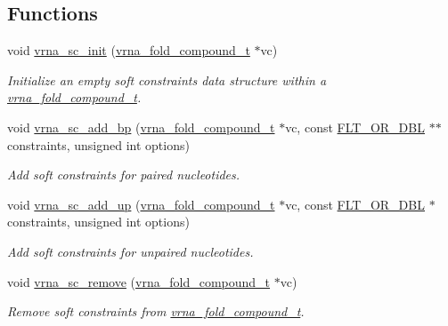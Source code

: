 \subsection*{Functions}
\begin{DoxyCompactItemize}
\item 
void \hyperlink{group__soft__constraints_ga9d977a1681356778cc66dceafbe5b032}{vrna\+\_\+sc\+\_\+init} (\hyperlink{group__fold__compound_ga1b0cef17fd40466cef5968eaeeff6166}{vrna\+\_\+fold\+\_\+compound\+\_\+t} $\ast$vc)
\begin{DoxyCompactList}\small\item\em Initialize an empty soft constraints data structure within a \hyperlink{group__fold__compound_ga1b0cef17fd40466cef5968eaeeff6166}{vrna\+\_\+fold\+\_\+compound\+\_\+t}. \end{DoxyCompactList}\item 
void \hyperlink{group__soft__constraints_ga86049d4bb0ea8674cae9b6177156b184}{vrna\+\_\+sc\+\_\+add\+\_\+bp} (\hyperlink{group__fold__compound_ga1b0cef17fd40466cef5968eaeeff6166}{vrna\+\_\+fold\+\_\+compound\+\_\+t} $\ast$vc, const \hyperlink{group__data__structures_ga31125aeace516926bf7f251f759b6126}{F\+L\+T\+\_\+\+O\+R\+\_\+\+D\+BL} $\ast$$\ast$constraints, unsigned int options)
\begin{DoxyCompactList}\small\item\em Add soft constraints for paired nucleotides. \end{DoxyCompactList}\item 
void \hyperlink{group__soft__constraints_ga30f30c8eff9676775a3e831d972b5284}{vrna\+\_\+sc\+\_\+add\+\_\+up} (\hyperlink{group__fold__compound_ga1b0cef17fd40466cef5968eaeeff6166}{vrna\+\_\+fold\+\_\+compound\+\_\+t} $\ast$vc, const \hyperlink{group__data__structures_ga31125aeace516926bf7f251f759b6126}{F\+L\+T\+\_\+\+O\+R\+\_\+\+D\+BL} $\ast$constraints, unsigned int options)
\begin{DoxyCompactList}\small\item\em Add soft constraints for unpaired nucleotides. \end{DoxyCompactList}\item 
void \hyperlink{group__soft__constraints_ga73cdc07b9a199c614367bebef0f2c41a}{vrna\+\_\+sc\+\_\+remove} (\hyperlink{group__fold__compound_ga1b0cef17fd40466cef5968eaeeff6166}{vrna\+\_\+fold\+\_\+compound\+\_\+t} $\ast$vc)
\begin{DoxyCompactList}\small\item\em Remove soft constraints from \hyperlink{group__fold__compound_ga1b0cef17fd40466cef5968eaeeff6166}{vrna\+\_\+fold\+\_\+compound\+\_\+t}. \end{DoxyCompactList}\item 
$$
\end{DoxyCompactItemize}
